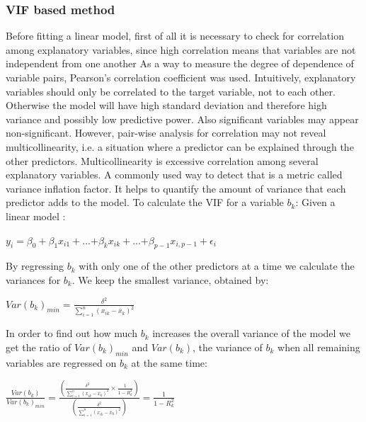 \documentclass[12pt,a4paper,english]{article}
\begin{document}
\subsubsection{VIF based method}

Before fitting a linear model, first of all it is necessary to check for correlation among explanatory variables, since high correlation means that variables are not independent from one another As a way to measure the degree of dependence of variable pairs, Pearson’s correlation coefficient was used.
Intuitively, explanatory variables should only be correlated to the target variable, not to each other. Otherwise the model will have high standard deviation and therefore high variance and possibly low predictive power. Also significant variables may appear non-significant.
However, pair-wise analysis for correlation may not reveal multicollinearity, i.e. a situation where a predictor can be explained through the other predictors. Multicollinearity is excessive correlation among several explanatory variables. A commonly used way to detect that is a metric called variance inflation factor. It helps to quantify the amount of variance that each predictor adds to the model.
To calculate the VIF for a variable $b_{k}$:
Given a linear model :  \\
\begin{center} $y_{i} = \beta_{0}+\beta_{1}x_{i1}+$...$+\beta_{k}x_{ik}+$...$+\beta_{p-1}x_{i,p-1}+\epsilon_{i} $ \end{center}

By regressing $b_{k}$ with only one of the other predictors at a time we calculate the variances for $ b_{k}$.
We keep the smallest variance, obtained by: \\
\begin{center} $Var(b_{k})_{min} = \frac{\delta^2 }{\sum_{i=1}^{n}(x_{ik} - \overline{x}_{k})^2}$ \end{center}

In order to find out how much $b_{k}$ increases the overall variance of the model we get the ratio of $Var(b_{k})_{min}$ and $Var(b_{k})$, the variance of $b_{k}$ when all remaining variables are regressed on $b_{k}$ at the same time:\\

\begin{center} $\frac{Var(b_{k})}{Var(b_{k})_{min}}=\frac{\left ( \frac{\delta^2 }{\sum_{i=1}^{n}(x_{ik} - \overline{x}_{k})^2} \times \frac{1}{1-R^2_{k}} \right )}{(\frac{\delta^2 }{\sum_{i=1}^{n}(x_{ik} - \overline{x}_{k})^2})}=\frac{1}{1-R^2_{k}}$ \end{center}
\end{document}
